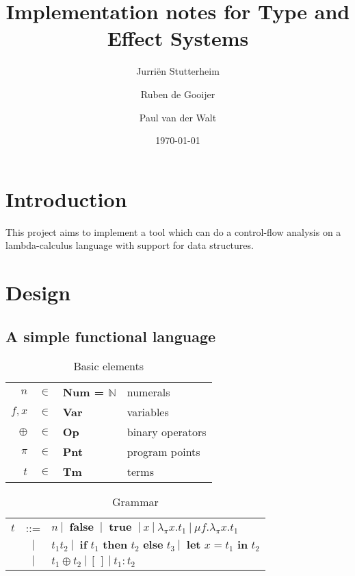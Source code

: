 \documentclass[a4paper]{article}
\author{Jurri\"en Stutterheim\and Ruben de Gooijer \and Paul van der Walt}
\date{\today}
\title{Implementation notes for Type and Effect Systems}
\begin{document}
\maketitle \tableofcontents

\section{Introduction}

This project aims to implement a tool which can do a control-flow analysis on a lambda-calculus language with support for
data structures. 

\section{Design}

\subsection{A simple functional language}


\begin{table}
    \centering
    \begin{tabular}{rcll}
        $n$ &           $\in$ & \textbf{Num = $\mathds{N}$}& numerals \\
        $f,x$ &         $\in$ & \textbf{Var}               & variables \\
        $\oplus$ &      $\in$ & \textbf{Op}                & binary operators \\
        $\pi$ &         $\in$ & \textbf{Pnt}               & program points  \\
        $t$ &           $\in$ & \textbf{Tm}                & terms \\
    \end{tabular}
    \caption{Basic elements}
    \label{tab:elems}
\end{table}

\begin{table}
    \centering
    \begin{tabular}{lcl}
        $t$ & ::= & $n\: |\: \textbf{ false }\: |\: \textbf{ true }\: |\: x\: |\: \lambda_\pi x.t_1\: |\: \mu f.\lambda_\pi x . t_1$ \\
            & $|$ & $t_1 t_2 \:|\: \textbf{ if } t_1 \textbf{ then } t_2 \textbf{ else } t_3 \:|\: \textbf{ let } x = t_1 \textbf{ in } t_2$\\
            & $|$ & $t_1 \oplus t_2 \:|\: [\,]\:|\:t_1:t_2 $\\
    \end{tabular}
    \caption{Grammar}
    \label{tab:grammar}
\end{table}
\end{document}
